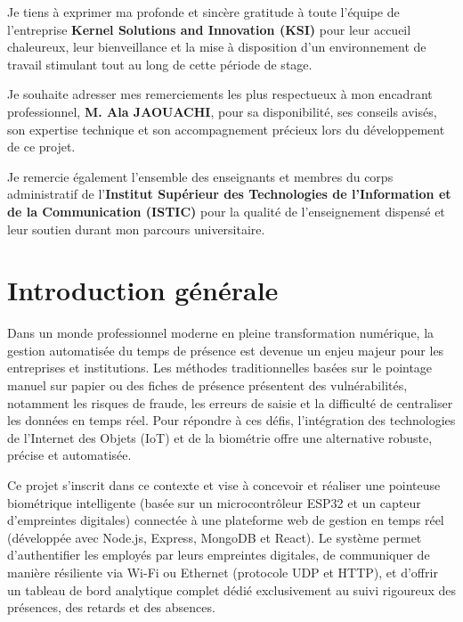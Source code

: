 \documentclass[12pt,a4paper]{report}
\begin{document}
{\large
Je tiens à exprimer ma profonde et sincère gratitude à toute l'équipe de l'entreprise \textbf{Kernel Solutions and Innovation (KSI)} pour leur accueil chaleureux, leur bienveillance et la mise à disposition d'un environnement de travail stimulant tout au long de cette période de stage.

\vspace{0.8cm}
Je souhaite adresser mes remerciements les plus respectueux à mon encadrant professionnel, \textbf{M. Ala JAOUACHI}, pour sa disponibilité, ses conseils avisés, son expertise technique et son accompagnement précieux lors du développement de ce projet.

\vspace{0.8cm}
Je remercie également l'ensemble des enseignants et membres du corps administratif de l'\textbf{Institut Supérieur des Technologies de l'Information et de la Communication (ISTIC)} pour la qualité de l'enseignement dispensé et leur soutien durant mon parcours universitaire.
}

\newpage

\tableofcontents
\newpage
\listoffigures
\newpage
\listoftables
\newpage

\chapter*{Introduction générale}

Dans un monde professionnel moderne en pleine transformation numérique, la gestion automatisée du temps de présence est devenue un enjeu majeur pour les entreprises et institutions. Les méthodes traditionnelles basées sur le pointage manuel sur papier ou des fiches de présence présentent des vulnérabilités, notamment les risques de fraude, les erreurs de saisie et la difficulté de centraliser les données en temps réel. Pour répondre à ces défis, l'intégration des technologies de l'Internet des Objets (IoT) et de la biométrie offre une alternative robuste, précise et automatisée.

\vspace{0.3cm}
Ce projet s'inscrit dans ce contexte et vise à concevoir et réaliser une pointeuse biométrique intelligente (basée sur un microcontrôleur ESP32 et un capteur d'empreintes digitales) connectée à une plateforme web de gestion en temps réel (développée avec Node.js, Express, MongoDB et React). Le système permet d'authentifier les employés par leurs empreintes digitales, de communiquer de manière résiliente via Wi-Fi ou Ethernet (protocole UDP et HTTP), et d'offrir un tableau de bord analytique complet dédié exclusivement au suivi rigoureux des présences, des retards et des absences.
\end{document}
